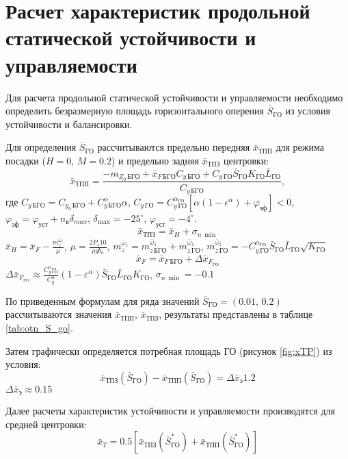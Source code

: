 \section{Расчет характеристик продольной статической устойчивости и
управляемости}

Для расчета продольной статической устойчивости и управляемости
необходимо определить безразмерную площадь горизонтального оперения
$\bar{S}_{ГО}$ из условия устойчивости и
балансировки.

Для определения $\bar{S}_{ГО}$ рассчитываются
предельно передняя $\bar{x}_{ТПП}$ для режима
посадки ($H=0,\, M=0.2$) и предельно задняя
$\bar{x}_{ТПЗ}$ центровки:
\begin{equation}
    \bar{x}_{ТПП} = \frac{-m_{Z_0\, БГО} + \bar{x}_{F\, БГО}C_{y\, БГО}+ 
    C_{y\, ГО} \bar{S}_{ГО} K_{ГО} \bar{L}_{ГО}}{C_{y\, БГО}},
\end{equation}
где $C_{y \, БГО} = C_{y_0\,{БГО}} + C_{y\, БГО}^\alpha \alpha$, 
$C_{y\, ГО} = C_{y\, ГО}^{\alpha_{ГО}} \left[ \alpha(1-\epsilon^\alpha) + 
\varphi_{эф}\right] < 0$, $\varphi_{эф} = \varphi_{уст} + n_в \delta_{max}$,
$\delta_{\max} = -25^\circ$, $\varphi_{уст} = -4^\circ$. 
\begin{equation}
    \bar{x}_{ТПЗ} = \bar{x}_{H} + \sigma_{n\, \min}
\end{equation}
$\bar{x}_{H} = \bar{x}_F - \frac{m_z^{\bar{\omega}_z}}{\mu}$, $\mu = \frac{2 P_s 10 }{\rho g b_a}$,
$m_z^{\bar{\omega}_z} = m_{z\, БГО}^{\bar{\omega}_z}+m_{z\, ГО}^{\bar{\omega}_z}$,
$m_{z\, ГО}^{\bar{\omega}_z} = - C_{y\, {ГО}}^{\alpha_{ГО}} \bar{S}_{ГО} \bar{L}_{ГО}
\sqrt{K_{ГО}}$
\begin{equation}
    \bar{x}_F = \bar{x}_{F\, БГО} + \Delta \bar{x}_{F_{ГО}}
\end{equation}
$ \Delta \bar{x}_{F_{ГО}} \approx \frac{C_{y\, ГО}^{\alpha_{ГО}} }{C_{y}^\alpha}
(1-\varepsilon^\alpha)\bar{S}_{ГО} \bar{L}_{ГО}
K_{ГО}$, $\sigma_{n\, \min} = -0.1$

По приведенным формулам для ряда значений
$\bar{S}_{ГО} = (0.01,\, 0.2)$ рассчитываются значения $\bar{x}_{ТПП}$,
$\bar{x}_{ТПЗ}$, результаты представлены в таблице \ref{tab:otn_S_go}. 

Затем графически  определяется потребная площадь ГО (рисунок \ref{fig:xTP}) из условия:
\[
    \bar{x}_{ТПЗ}(\bar{S}_{ГО}) - \bar{x}_{ТПП}(\bar{S}_{ГО}) = \Delta \bar{x}_{э} 1.2 
\]
$\Delta \bar{x}_{э} \approx 0.15$

Далее расчеты характеристик устойчивости и управляемости производятся
для средней центровки: 
\[
    \bar{x}_{T} = 0.5 \left[  \bar{x}_{ТПЗ}(\bar{S}_{ГО}^*) + \bar{x}_{ТПП}(\bar{S}_{ГО}^*) \right] 
\]

